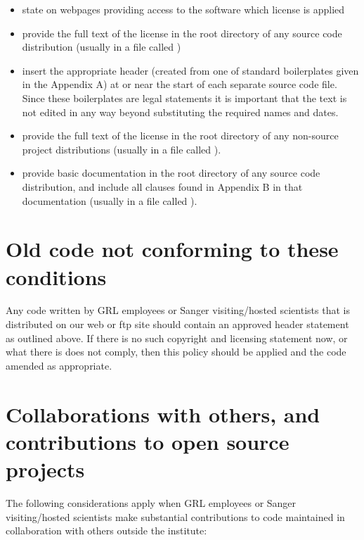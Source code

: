 \documentclass[10pt,a4paper]{article}
\begin{document}
\begin{itemize}
\item state on webpages providing access to the software which license is applied 
\item provide the full text of the license in the root directory of any source code 
distribution (usually in a file called ) 
\item insert the appropriate header (created from one of standard boilerplates given in 
the Appendix A) at or near the start of each separate source code file. Since these 
boilerplates are legal statements it is important that the text is not edited in any 
way beyond substituting the required names and dates.
\item provide the full text of the license in the root directory of any non-source project 
distributions (usually in a file called ). 
\item provide basic documentation in the root directory of any source code 
distribution, and include all clauses found in Appendix B in that documentation 
(usually in a file called ). 
\end{itemize}


\section{Old code not conforming to these conditions}

Any code written by GRL employees or Sanger visiting/hosted scientists that is 
distributed on our web or ftp site should contain an approved header statement as 
outlined above. If there is no such copyright and licensing statement now, or what 
there is does not comply, then this policy should be applied and the code amended as 
appropriate. 


\section{Collaborations with others, and contributions to open source projects}

The following considerations apply when GRL employees or Sanger visiting/hosted 
scientists make substantial contributions to code maintained in collaboration with 
others outside the institute: 
\end{document}
